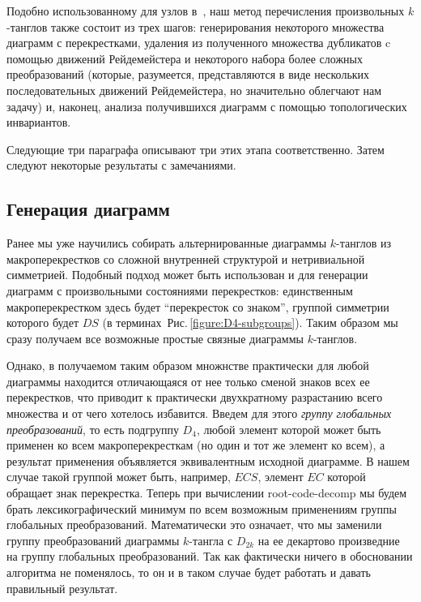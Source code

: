 \documentclass[12pt]{article}
\theoremstyle{plain}
\theoremstyle{definition}
\def\figureref#1{Рис.\,\protect\ref{#1}}
\def\RCD{\hbox{root-code-decomp}}
\begin{document}
		Подобно использованному для узлов в~\cite{HosteThistlethwaiteWeeks1998}, наш метод перечисления произвольных $k$-танглов
		также состоит из трех шагов: генерирования некоторого множества диаграмм с перекрестками, удаления из полученного множества
		дубликатов c помощью движений Рейдемейстера и некоторого набора более сложных преобразований (которые, разумеется, представляются в
		виде нескольких последовательных движений Рейдемейстера, но значительно облегчают нам задачу) и, наконец, анализа получившихся
		диаграмм с помощью топологических инвариантов.

		Следующие три параграфа описывают три этих этапа соответственно. Затем следуют некоторые результаты с замечаниями.

	\subsection{Генерация диаграмм}

		Ранее мы уже научились собирать альтернированные диаграммы $k$-танглов из макроперекрестков со сложной внутренней структурой и
		нетривиальной симметрией. Подобный подход может быть использован и для генерации диаграмм с произвольными состояниями перекрестков:
		единственным макроперекрестком здесь будет ``перекресток со знаком'', группой симметрии которого будет $DS$ (в
		терминах~\figureref{figure:D4-subgroups}). Таким образом мы сразу получаем все возможные простые связные диаграммы $k$-танглов.

		Однако, в получаемом таким образом множнстве практически для любой диаграммы находится отличающаяся от нее только сменой знаков
		всех ее перекрестков, что приводит к практически двухкратному разрастанию всего множества и от чего хотелось избавится. Введем
		для этого \textit{группу глобальных преобразований}, то есть подгруппу $D_4$, любой элемент которой может быть применен ко всем
		макроперекресткам (но один и тот же элемент ко всем), а результат применения объявляется эквивалентным исходной диаграмме. В нашем
		случае такой группой может быть, например, $ECS$, элемент $EC$ которой обращает знак перекрестка. Теперь при вычислении \RCD{} мы
		будем брать лексикографический минимум по всем возможным применениям группы глобальных преобразований. Математически это означает,
		что мы заменили группу преобразований диаграммы $k$-тангла с $D_{2k}$ на ее декартово произведние на группу глобальных преобразований.
		Так как фактически ничего в обосновании алгоритма не поменялось, то он и в таком случае будет работать и давать правильный результат.
\end{document}
